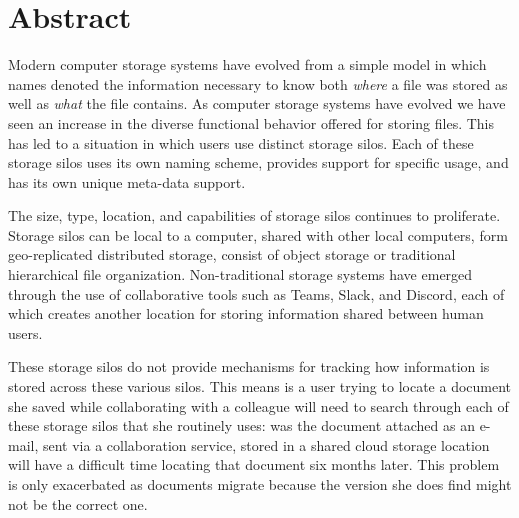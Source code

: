 
\chapter{Abstract}


Modern computer storage systems have evolved from a simple model in which names denoted
the information necessary to know both \textit{where} a file was stored as well
as \textit{what} the file contains.
As computer storage systems have evolved we
have seen an increase in the diverse functional behavior offered for storing
files.  This has led to a situation in which users use distinct storage silos.
Each of these storage silos uses its own naming scheme, provides support for
specific usage, and has its own unique meta-data support.

The size, type, location, and capabilities of storage silos continues to
proliferate.  Storage silos can be local to a computer, shared with other local computers,
form geo-replicated distributed storage, consist of object storage or
traditional hierarchical file organization.  Non-traditional storage systems
have emerged through the use of collaborative tools such as Teams, Slack, and
Discord, each of which creates another location for storing in\-for\-ma\-tion shared
between human users.

These storage silos do not provide mechanisms for tracking how information is
stored across these various silos.  This means is a user trying to locate a
document she saved while collaborating with a colleague will need to search
through each of these storage silos that she routinely uses: was the document
attached as an e-mail, sent via a collaboration service, stored in a shared
cloud storage location will have a difficult time locating that document six
months later. This problem is only exacerbated as documents migrate because the
version she does find might not be the correct one.

